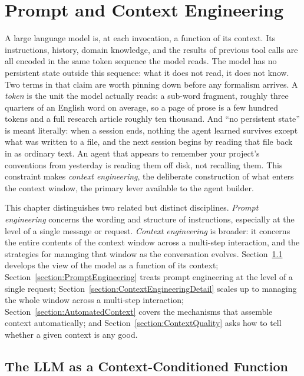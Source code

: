 \chapter{Prompt and Context Engineering}
\label{chapter:ContextEngineering}

A large language model is, at each invocation, a function of its context.
Its instructions, history, domain knowledge, and the results of previous tool calls are all encoded in the same token sequence the model reads.
The model has no persistent state outside this sequence: what it does not read, it does not know.
Two terms in that claim are worth pinning down before any formalism arrives.
A \emph{token} is the unit the model actually reads: a sub-word fragment, roughly three quarters of an English word on average, so a page of prose is a few hundred tokens and a full research article roughly ten thousand.
And ``no persistent state'' is meant literally: when a session ends, nothing the agent learned survives except what was written to a file, and the next session begins by reading that file back in as ordinary text.
An agent that appears to remember your project's conventions from yesterday is reading them off disk, not recalling them.
This constraint makes \emph{context engineering}, the deliberate construction of what enters the context window, the primary lever available to the agent builder.

This chapter distinguishes two related but distinct disciplines.
\emph{Prompt engineering} concerns the wording and structure of instructions, especially at the level of a single message or request.
\emph{Context engineering} is broader: it concerns the entire contents of the context window across a multi-step interaction, and the strategies for managing that window as the conversation evolves.
Section~\ref{section:LLMContextFunction} develops the view of the model as a function of its context; Section~\ref{section:PromptEngineering} treats prompt engineering at the level of a single request; Section~\ref{section:ContextEngineeringDetail} scales up to managing the whole window across a multi-step interaction; Section~\ref{section:AutomatedContext} covers the mechanisms that assemble context automatically; and Section~\ref{section:ContextQuality} asks how to tell whether a given context is any good.

\section{The LLM as a Context-Conditioned Function}
\label{section:LLMContextFunction}

